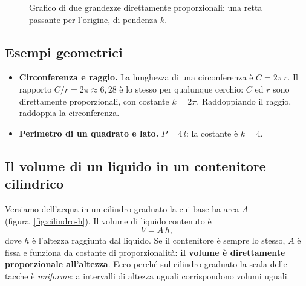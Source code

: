 \begin{figure}[!htbp]
    \centering
    \caption{Grafico di due grandezze direttamente proporzionali: una retta passante per l'origine, di pendenza $k$.}
    \label{fig:rel-diretta}
\end{figure}

\subsection{Esempi geometrici}
\begin{itemize}
    \item \textbf{Circonferenza e raggio.} La lunghezza di una circonferenza è $C = 2\pi\,r$. Il rapporto $C/r = 2\pi \approx 6{,}28$ è lo stesso per qualunque cerchio: $C$ ed $r$ sono direttamente proporzionali, con costante $k = 2\pi$. Raddoppiando il raggio, raddoppia la circonferenza.
    \item \textbf{Perimetro di un quadrato e lato.} $P = 4\,l$: la costante è $k = 4$.
\end{itemize}

\subsection{Il volume di un liquido in un contenitore cilindrico}
Versiamo dell'acqua in un cilindro graduato la cui base ha area $A$ (figura~\ref{fig:cilindro-h}). Il volume di liquido contenuto è
\[ V = A\,h, \]
dove $h$ è l'altezza raggiunta dal liquido. Se il contenitore è sempre lo stesso, $A$ è fissa e funziona da costante di proporzionalità: \textbf{il volume è direttamente proporzionale all'altezza}. Ecco perché sul cilindro graduato la scala delle tacche è \emph{uniforme}: a intervalli di altezza uguali corrispondono volumi uguali.

